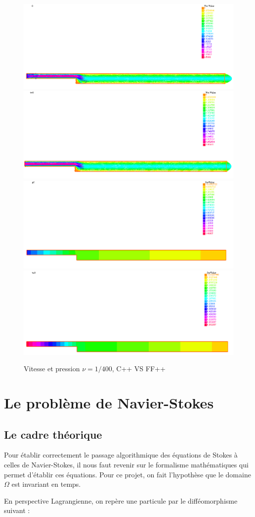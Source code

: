 \documentclass[a4paper,12pt]{article}
\begin{document}
\begin{figure}[!h]
	\caption{Vitesse et pression $\nu = 1/400$, C++ VS FF++}
	\centering
	\includegraphics[width=0.49\linewidth]{image/c++_S_nu=00025_t=0_u.png}
	\includegraphics[width=0.49\linewidth]{image/ff++_S_nu=00025_t=0_u.png}
	\includegraphics[width=0.49\linewidth]{image/c++_S_nu=00025_t=0_p.png}
	\includegraphics[width=0.49\linewidth]{image/ff++_S_nu=00025_t=0_p.png}
\end{figure}


\newpage

\section{Le problème de Navier-Stokes}


\subsection{Le cadre théorique}

Pour établir correctement le passage algorithmique des équations de Stokes à celles de Navier-Stokes, il nous faut revenir sur le formalisme mathématiques qui permet d'établir ces équations. Pour ce projet, on fait l'hypothèse que le domaine $\Omega$ est invariant en temps.

En perspective Lagrangienne, on repère une particule par le difféomorphisme suivant :
\end{document}
